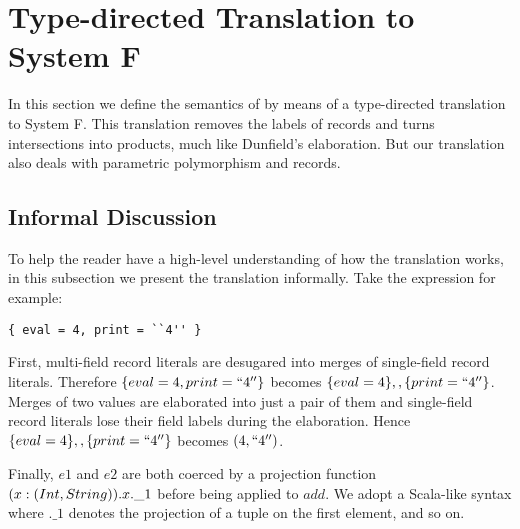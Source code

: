 \section{Type-directed Translation to System F}

In this section we define the semantics of \name by means of a type-directed
translation to System F. This translation removes the labels of records and
turns intersections into products, much like Dunfield's elaboration. But our
translation also deals with parametric polymorphism and records.

\subsection{Informal Discussion}

To help the reader have a high-level understanding of how the translation
works, in this subsection we present the translation informally. Take the \name
expression for example:

\begin{lstlisting}
{ eval = 4, print = ``4'' }
\end{lstlisting}

First, multi-field record literals are desugared into merges of single-field
record literals. Therefore $ \{ eval = 4, print = ``4'' \} $ becomes
$ \{ eval = 4 \} ,, \{ print = ``4'' \} $. Merges of two values are elaborated
into just a pair of them and single-field record literals lose their field
labels during the elaboration. Hence $ \{ eval = 4 \} ,, \{ print = ``4'' \} $
becomes $ (4, ``4'') $.

Finally, $ e1 $ and $ e2 $ are both coerced by a projection function
$ \\(x:(Int,String)). x.\_1 $ before being applied to $ add $. We adopt a
Scala-like syntax where $ .\_1 $ denotes the projection of a tuple on the first
element, and so on.

